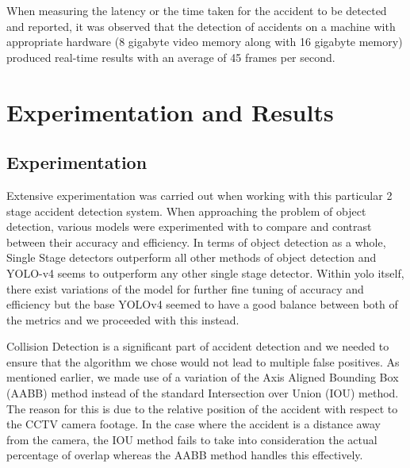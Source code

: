 \documentclass[ 12pt,a4paper,twocolumn,fleqn]{article}
\begin{document}
\begin{adjustwidth}{3.5em}{0pt}
When measuring the latency or the time taken for the accident to be detected and reported, it was observed that the detection of accidents on a machine with appropriate hardware (8 gigabyte video memory along with 16 gigabyte memory) produced real-time results with an average of 45 frames per second.


\newpage
  \pagestyle{fancy}
  
\section{Experimentation and Results}

\subsection{Experimentation}

Extensive experimentation was carried out when working with this particular 2 stage accident detection system. When approaching the problem of object detection, various models were experimented with to compare and contrast between their accuracy and efficiency.
In terms of object detection as a whole, Single Stage detectors outperform all other methods of object detection and YOLO-v4 seems to outperform any other single stage detector.
Within yolo itself, there exist variations of the model for further fine tuning of accuracy and efficiency but the base YOLOv4 seemed to have a good balance between both of the metrics and we proceeded with this instead.

\hspace{0.2cm}

Collision Detection is a significant part of accident detection and we needed to ensure that the algorithm we chose would not lead to multiple false positives. As mentioned earlier, we made use of a variation of the Axis Aligned Bounding Box (AABB) method instead of the standard Intersection over Union (IOU) method. The reason for this is due to the relative position of the accident with respect to the CCTV camera footage. In the case where the accident is a distance away from the camera, the IOU method fails to take into consideration the actual percentage of overlap whereas the AABB method handles this effectively.

\newpage
  \pagestyle{fancy}
  

\end{adjustwidth}
\end{document}

